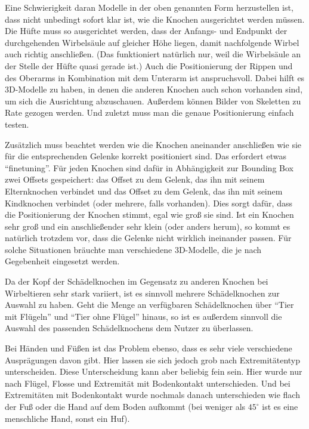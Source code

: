 Eine Schwierigkeit daran Modelle in der oben genannten Form herzustellen ist, dass nicht unbedingt sofort klar ist, wie die Knochen ausgerichtet werden müssen. Die Hüfte muss \zb so ausgerichtet werden, dass der Anfangs- und Endpunkt der durchgehenden Wirbelsäule auf gleicher Höhe liegen, damit nachfolgende Wirbel auch richtig anschließen. (Das funktioniert natürlich nur, weil die Wirbelsäule an der Stelle der Hüfte quasi gerade ist.) 
Auch die Positionierung der Rippen und des Oberarms in Kombination mit dem Unterarm ist anspruchsvoll. Dabei hilft es 3D-Modelle zu haben, in denen die anderen Knochen auch schon vorhanden sind, um sich die Ausrichtung abzuschauen. Außerdem können Bilder von Skeletten zu Rate gezogen werden. Und zuletzt muss man die genaue Positionierung einfach testen.

Zusätzlich muss beachtet werden wie die Knochen aneinander anschließen \bzw wie sie für die entsprechenden Gelenke korrekt positioniert sind. Das erfordert etwas "`finetuning"'. Für jeden Knochen sind dafür in Abhängigkeit zur Bounding Box zwei Offsets gespeichert: das Offset zu dem Gelenk, das ihn mit seinem Elternknochen verbindet und das Offset zu dem Gelenk, das ihn mit seinem Kindknochen verbindet (oder mehrere, falls vorhanden). Dies sorgt dafür, dass die Positionierung der Knochen stimmt, egal wie groß sie sind. Ist ein Knochen sehr groß und ein anschließender sehr klein (oder anders herum), so kommt es natürlich trotzdem vor, dass die Gelenke nicht wirklich ineinander passen. Für solche Situationen bräuchte man verschiedene 3D-Modelle, die je nach Gegebenheit eingesetzt werden.

Da der Kopf \bzw der Schädelknochen im Gegensatz zu anderen Knochen bei Wirbeltieren sehr stark variiert, ist es sinnvoll mehrere Schädelknochen zur Auswahl zu haben. Geht die Menge an verfügbaren Schädelknochen über "`Tier mit Flügeln"' und "`Tier ohne Flügel"' hinaus, so ist es außerdem sinnvoll die Auswahl des passenden Schädelknochens dem Nutzer zu überlassen.



Bei Händen und Füßen ist das Problem ebenso, dass es sehr viele verschiedene Ausprägungen davon gibt. Hier lassen sie sich jedoch grob nach Extremitätentyp unterscheiden. Diese Unterscheidung kann aber beliebig fein sein. Hier wurde nur nach Flügel, Flosse  und Extremität mit Bodenkontakt unterschieden. Und bei Extremitäten mit Bodenkontakt wurde nochmals danach unterschieden wie flach der Fuß oder die Hand auf dem Boden aufkommt (bei weniger als $45^\circ$ ist es eine menschliche Hand, sonst ein Huf). 

